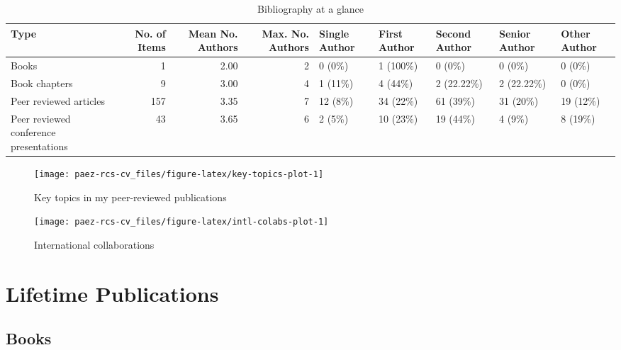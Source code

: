 \documentclass[11pt,a4paper,]{awesome-cv}
\begin{document}
\begin{table}[H]
\centering
\caption{\label{tab:unnamed-chunk-2}\label{tab:bibliography-at-a-glance}Bibliography at a glance}
\centering
\fontsize{7}{9}\selectfont
\begin{tabular}[t]{l|r|r|r|l|l|l|l|l}
\hline
Type & No. of Items & Mean No. Authors & Max. No. Authors & Single Author & First Author & Second Author & Senior Author & Other Author\\
\hline
Books & 1 & 2.00 & 2 & 0 (0\%) & 1 (100\%) & 0 (0\%) & 0 (0\%) & 0 (0\%)\\
\hline
Book chapters & 9 & 3.00 & 4 & 1 (11\%) & 4 (44\%) & 2 (22.22\%) & 2 (22.22\%) & 0 (0\%)\\
\hline
Peer reviewed articles & 157 & 3.35 & 7 & 12 (8\%) & 34 (22\%) & 61 (39\%) & 31 (20\%) & 19 (12\%)\\
\hline
Peer reviewed conference presentations & 43 & 3.65 & 6 & 2 (5\%) & 10 (23\%) & 19 (44\%) & 4 (9\%) & 8 (19\%)\\
\hline
\end{tabular}
\end{table}

\begin{figure}

{\centering \texttt{[image: paez-rcs-cv\_files/figure-latex/key-topics-plot-1]} 

}

\caption{\label{fig:key-topics}Key topics in my peer-reviewed publications}\label{fig:key-topics-plot}
\end{figure}

\begin{figure}

{\centering \texttt{[image: paez-rcs-cv\_files/figure-latex/intl-colabs-plot-1]} 

}

\caption{\label{fig:intl-colabs}International collaborations}\label{fig:intl-colabs-plot}
\end{figure}

\newpage

\section{Lifetime Publications}\label{lifetime-publications}

\subsection{Books}\label{books}
\end{document}
